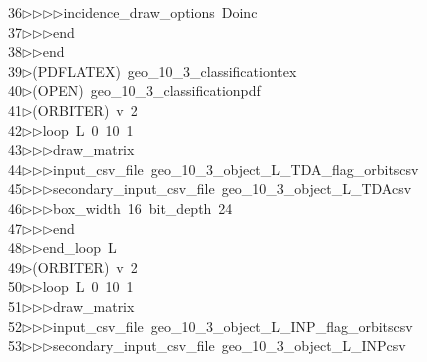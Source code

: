 \begin{tabbing}
36\>$\triangleright$\>$\triangleright$\>$\triangleright$\>$\triangleright$\>incidence\_draw\_options\ Doinc\ \\[0pt]
37\>$\triangleright$\>$\triangleright$\>$\triangleright$\>end\ \\[0pt]
38\>$\triangleright$\>$\triangleright$\>end\\[0pt]
39\>$\triangleright$\>(PDFLATEX)\ geo\_10\_3\_classificationtex\\[0pt]
40\>$\triangleright$\>(OPEN)\ geo\_10\_3\_classificationpdf\\[0pt]
41\>$\triangleright$\>(ORBITER)\ v\ 2\ \\[0pt]
42\>$\triangleright$\>$\triangleright$\>loop\ L\ 0\ 10\ 1\ \\[0pt]
43\>$\triangleright$\>$\triangleright$\>$\triangleright$\>draw\_matrix\ \\[0pt]
44\>$\triangleright$\>$\triangleright$\>$\triangleright$\>input\_csv\_file\ geo\_10\_3\_object\_L\_TDA\_flag\_orbitscsv\ \\[0pt]
45\>$\triangleright$\>$\triangleright$\>$\triangleright$\>secondary\_input\_csv\_file\ geo\_10\_3\_object\_L\_TDAcsv\ \\[0pt]
46\>$\triangleright$\>$\triangleright$\>$\triangleright$\>box\_width\ 16\ bit\_depth\ 24\ \\[0pt]
47\>$\triangleright$\>$\triangleright$\>$\triangleright$\>end\ \\[0pt]
48\>$\triangleright$\>$\triangleright$\>end\_loop\ L\\[0pt]
49\>$\triangleright$\>(ORBITER)\ v\ 2\ \\[0pt]
50\>$\triangleright$\>$\triangleright$\>loop\ L\ 0\ 10\ 1\ \\[0pt]
51\>$\triangleright$\>$\triangleright$\>$\triangleright$\>draw\_matrix\ \\[0pt]
52\>$\triangleright$\>$\triangleright$\>$\triangleright$\>input\_csv\_file\ geo\_10\_3\_object\_L\_INP\_flag\_orbitscsv\ \\[0pt]
53\>$\triangleright$\>$\triangleright$\>$\triangleright$\>secondary\_input\_csv\_file\ geo\_10\_3\_object\_L\_INPcsv\ \\[0pt]

\end{tabbing}
